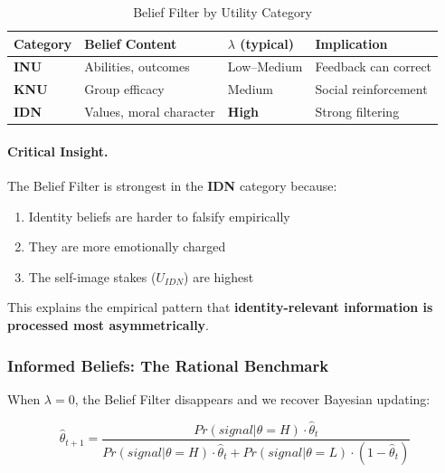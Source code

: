 \begin{table}[htbp]
\centering
\caption{Belief Filter by Utility Category}
\label{tab:beliefs-by-category}
\renewcommand{\arraystretch}{1.4}
\begin{tabular}{@{}llll@{}}
\toprule
\textbf{Category} & \textbf{Belief Content} & \textbf{$\lambda$ (typical)} & \textbf{Implication} \\
\midrule
\textbf{INU} & Abilities, outcomes & Low--Medium & Feedback can correct \\
\textbf{KNU} & Group efficacy & Medium & Social reinforcement \\
\textbf{IDN} & Values, moral character & \textbf{High} & Strong filtering \\
\bottomrule
\end{tabular}
\end{table}

\paragraph{Critical Insight.}
The Belief Filter is strongest in the \textbf{IDN} category because:
\begin{enumerate}
\item Identity beliefs are harder to falsify empirically
\item They are more emotionally charged
\item The self-image stakes ($U_{IDN}$) are highest
\end{enumerate}

This explains the empirical pattern that \textbf{identity-relevant information 
is processed most asymmetrically}.

\subsubsection{Informed Beliefs: The Rational Benchmark}
\label{subsubsec:informed-beliefs}

When $\lambda = 0$, the Belief Filter disappears and we recover Bayesian updating:

\begin{equation}
\hat{\theta}_{t+1} = \frac{Pr(signal | \theta = H) \cdot \hat{\theta}_t}{Pr(signal | \theta = H) \cdot \hat{\theta}_t + Pr(signal | \theta = L) \cdot (1-\hat{\theta}_t)}
\end{equation}

